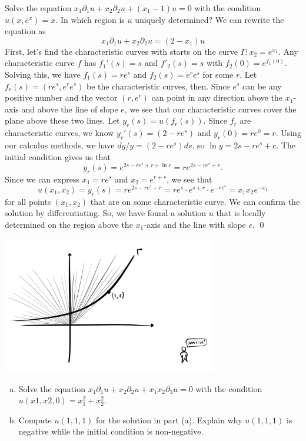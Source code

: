 \documentclass{article}
\renewcommand{\d}{\partial}
\begin{document}
\newpage
{} Solve the equation $x_1\d_1u+x_2\d_2u+(x_1-1)u = 0$ with the condition $u(x, e^x) = x$.
In which region is $u$ uniquely determined?\tri
\hop
\solution We can rewrite the equation as 
\[x_1\d_1u+x_2\d_2u=(2-x_1)u\]
First, let's find the characteristic curves with starts on the curve $\Gamma: x_2 = e^{x_1}$. Any characteristic curve $f$ has $f_1'(s) = s$ and $f'_2(s) = s$ with $f_2(0)=e^{f_1(0)}$. 
\hop 
Solving this, we have $f_1(s) = re^s$ and $f_2(s) = e^re^s$ for some $r$. Let $f_r(s) = (re^s, e^re^s)$ be the characteristic curves, then. Since $e^s$ can be any positive number and the vector $(r,e^r)$ can point in any direction above the $x_1$-axis and above the line of slope $e$, we see that our characteristic curves cover the plane above these two lines.
\hop
Let $y_r(s) = u(f_r(s))$. Since $f_r$ are characteristic curves, we know $y_r'(s)=(2-re^s)$ and $y_r(0)=re^0 = r$. Using our calculus methods, we have $dy/y = (2-re^s)ds$, so $\ln y = 2s-re^s+c$. The initial condition gives us that  
\[y_r(s)=e^{2s-re^s+r+\ln r}=re^{2s-re^s+r}.\]
Since we can express $x_1 = re^s$ and $x_2 = e^{r+s}$, we see that 
\[u(x_1,x_2) = y_r(s) = re^{2s-re^s+r} = re^s \cdot e^{s+r}\cdot e^{-re^s} = x_1x_2e^{-x_1}\]
for all points $(x_1, x_2)$ that are on some characteristic curve. We can confirm the solution by differentiating. So, we have found a solution $u$ that is locally determined on the region above the $x_1$-axis and the line with slope $e$. \qed
\begin{center}
    \includegraphics[height=6cm]{../images/sunrise}
\end{center}
\newpage
{} 
\begin{enumerate}[(a)]
    \item Solve the equation $x_1\d_1u+x_2\d_2u+x_1x_2\d_3u = 0$ with the condition $u(x1, x2, 0) =
    x^2_1 + x^2_2$.
    \item Compute $u(1, 1, 1)$ for the solution in part (a). Explain why $u(1, 1, 1)$ is negative while the
    initial condition is non-negative.
\end{enumerate}
\end{document}
